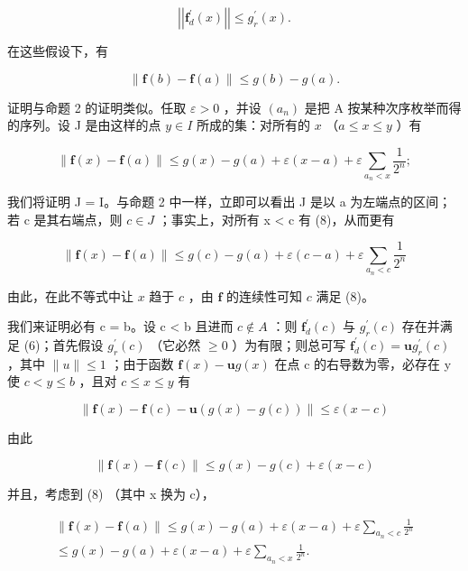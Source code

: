 \[
\left| \left| \mathbf {f} _ {d} ^ {\prime} (x) \right| \right| \leqslant g _ {r} ^ {\prime} (x).\tag{6}
\]

在这些假设下，有

\[
\| \mathbf {f} (b) - \mathbf {f} (a) \| \leqslant g (b) - g (a).\tag{7}
\]

证明与命题 2 的证明类似。任取 \(\varepsilon > 0\) ，并设 \((a_{n})\) 是把 A 按某种次序枚举而得的序列。设 J 是由这样的点 \(y \in I\) 所成的集：对所有的 \(x\) （\(a \leqslant x \leqslant y\) ）有

\[
\| \mathbf {f} (x) - \mathbf {f} (a) \| \leqslant g (x) - g (a) + \varepsilon (x - a) + \varepsilon \sum_ {a _ {n} <   x} \frac {1}{2 ^ {n}};\tag{8}
\]

我们将证明 J = I。与命题 2 中一样，立即可以看出 J 是以 a 为左端点的区间；若 c 是其右端点，则 \(c \in J\) ；事实上，对所有 x \textless{} c 有 (8)，从而更有

\[
\| \mathbf {f} (x) - \mathbf {f} (a) \| \leqslant g (c) - g (a) + \varepsilon (c - a) + \varepsilon \sum_ {a _ {n} <   c} \frac {1}{2 ^ {n}}
\]

由此，在此不等式中让 \(x\) 趋于 \(c\) ，由 \(\mathbf{f}\) 的连续性可知 \(c\) 满足 (8)。

我们来证明必有 c = b。设 c \textless{} b 且进而 \(c \notin A\) ：则 \(\mathbf{f}_{d}^{\prime}(c)\) 与 \(g_{r}^{\prime}(c)\) 存在并满足 (6)；首先假设 \(g_{r}^{\prime}(c)\) （它必然 \(\geqslant 0\) ）为有限；则总可写 \(\mathbf{f}_{d}^{\prime}(c) = \mathbf{u}g_{r}^{\prime}(c)\) ，其中 \(\|u\| \leqslant 1\) ；由于函数 \(\mathbf{f}(x) - \mathbf{u}g(x)\) 在点 c 的右导数为零，必存在 y 使 \(c < y \leqslant b\) ，且对 \(c \leqslant x \leqslant y\) 有

\[
\| \mathbf {f} (x) - \mathbf {f} (c) - \mathbf {u} (g (x) - g (c)) \| \leqslant \varepsilon (x - c)
\]

由此

\[
\| \mathbf {f} (x) - \mathbf {f} (c) \| \leqslant g (x) - g (c) + \varepsilon (x - c)
\]

并且，考虑到 (8) （其中 x 换为 c），

\[
\begin{array}{c} \| \mathbf {f} (x) - \mathbf {f} (a) \| \leqslant g (x) - g (a) + \varepsilon (x - a) + \varepsilon \sum_ {a _ {n} <   c} \frac {1}{2 ^ {n}} \\ \leqslant g (x) - g (a) + \varepsilon (x - a) + \varepsilon \sum_ {a _ {n} <   x} \frac {1}{2 ^ {n}}. \end{array}
\]

